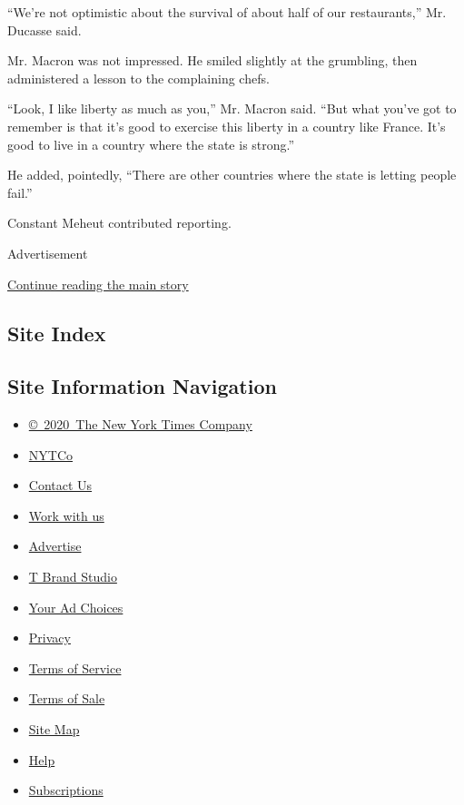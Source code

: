 ``We're not optimistic about the survival of about half of our
restaurants,'' Mr. Ducasse said.

Mr. Macron was not impressed. He smiled slightly at the grumbling, then
administered a lesson to the complaining chefs.

``Look, I like liberty as much as you,'' Mr. Macron said. ``But what
you've got to remember is that it's good to exercise this liberty in a
country like France. It's good to live in a country where the state is
strong.''

He added, pointedly, ``There are other countries where the state is
letting people fail.''

Constant Meheut contributed reporting.

Advertisement

\protect\hyperlink{after-bottom}{Continue reading the main story}

\hypertarget{site-index}{%
\subsection{Site Index}\label{site-index}}

\hypertarget{site-information-navigation}{%
\subsection{Site Information
Navigation}\label{site-information-navigation}}

\begin{itemize}
\tightlist
\item
  \href{https://help.nytimes.com/hc/en-us/articles/115014792127-Copyright-notice}{©~2020~The
  New York Times Company}
\end{itemize}

\begin{itemize}
\tightlist
\item
  \href{https://www.nytco.com/}{NYTCo}
\item
  \href{https://help.nytimes.com/hc/en-us/articles/115015385887-Contact-Us}{Contact
  Us}
\item
  \href{https://www.nytco.com/careers/}{Work with us}
\item
  \href{https://nytmediakit.com/}{Advertise}
\item
  \href{http://www.tbrandstudio.com/}{T Brand Studio}
\item
  \href{https://www.nytimes.com/privacy/cookie-policy\#how-do-i-manage-trackers}{Your
  Ad Choices}
\item
  \href{https://www.nytimes.com/privacy}{Privacy}
\item
  \href{https://help.nytimes.com/hc/en-us/articles/115014893428-Terms-of-service}{Terms
  of Service}
\item
  \href{https://help.nytimes.com/hc/en-us/articles/115014893968-Terms-of-sale}{Terms
  of Sale}
\item
  \href{https://spiderbites.nytimes.com}{Site Map}
\item
  \href{https://help.nytimes.com/hc/en-us}{Help}
\item
  \href{https://www.nytimes.com/subscription?campaignId=37WXW}{Subscriptions}
\end{itemize}
